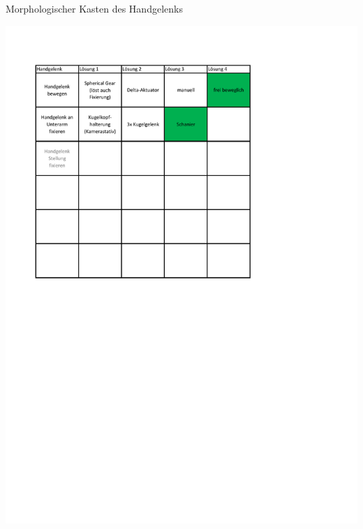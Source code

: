 	\begin{table}[h]
		\caption[Morphologischer Kasten des Handgelenks]{Morphologischer Kasten des Handgelenks}
		\centering
		\includegraphics[width=\textwidth]{"Abb/Morphologischer Kasten Handgelenk"}
		\label{fig:morphologische-kasten-handgelenk}
	\end{table}


